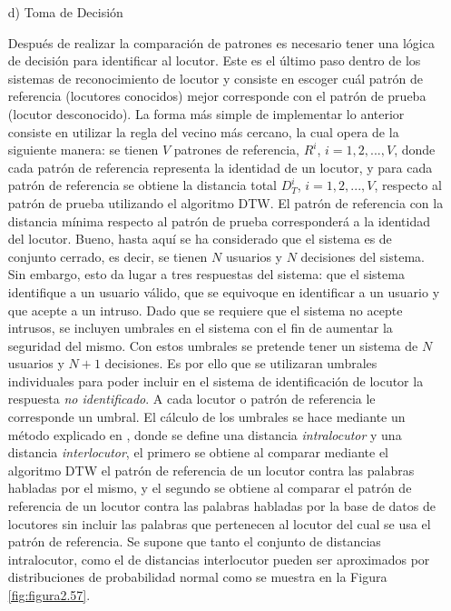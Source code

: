 \begin{enumerate}
\item[d)]Toma de Decisión
\par
Después de realizar la comparación de patrones es necesario tener una lógica de decisión para identificar al locutor. Este es el último paso dentro de los sistemas de reconocimiento de locutor y consiste en escoger cuál patrón de referencia (locutores conocidos) mejor corresponde con el patrón de prueba (locutor desconocido). 
\vskip 0.5cm
La forma más simple de implementar lo anterior consiste en utilizar la regla del vecino más cercano, la cual opera de la siguiente manera: se tienen $V$ patrones de referencia, $R^{i}$, $i = 1,2,...,V$, donde cada patrón de referencia representa la identidad de un locutor, y para cada patrón de referencia se obtiene la distancia total $D^{i}_{T}$, $i = 1,2,...,V$, respecto al patrón de prueba utilizando el algoritmo DTW. El patrón de referencia con la distancia mínima respecto al patrón de prueba corresponderá a la identidad del locutor.
\vskip 0.5cm
Bueno, hasta aquí se ha considerado que el sistema es de conjunto cerrado, es decir, se tienen $N$ usuarios y $N$ decisiones del sistema. Sin embargo, esto da lugar a tres respuestas del sistema: que el sistema identifique a un usuario válido, que se equivoque en identificar a un usuario y que acepte a un intruso. Dado que se requiere que el sistema no acepte intrusos, se incluyen umbrales en el sistema con el fin de aumentar la seguridad del mismo. Con estos umbrales se pretende tener un sistema de $N$ usuarios y $N+1$ decisiones.
\vskip 0.5cm
Es por ello que se utilizaran umbrales individuales para poder incluir en el sistema de identificación de locutor la respuesta \textit{no identificado}. A cada locutor o patrón de referencia le corresponde un umbral. El cálculo de los umbrales se hace mediante un método explicado en \citep{varela}, donde se define una distancia \textit{intralocutor} y una distancia \textit{interlocutor}, el primero se obtiene al comparar mediante el algoritmo DTW el patrón de referencia de un locutor contra las palabras habladas por el mismo, y el segundo se obtiene al comparar el patrón de referencia de un locutor contra las palabras habladas por la base de datos de locutores sin incluir las palabras que pertenecen al locutor del cual se usa el patrón de referencia. 
\vskip 0.5cm
Se supone que tanto el conjunto de distancias intralocutor, como el de distancias interlocutor pueden ser aproximados por distribuciones de probabilidad normal como se muestra en la Figura \ref{fig:figura2.57}.


\end{enumerate}
